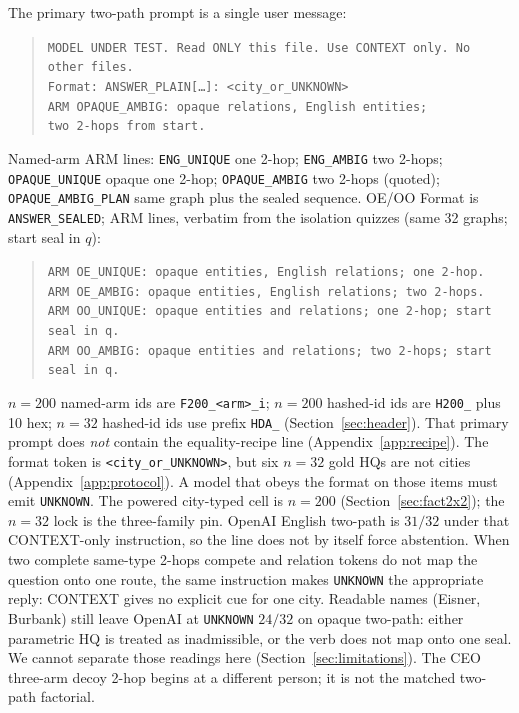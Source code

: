 \documentclass{article}
\begin{document}
The primary two-path prompt is a single user message:
\begin{quote}
\small
\texttt{MODEL UNDER TEST. Read ONLY this file. Use CONTEXT only. No other files.}\\
\texttt{Format: ANSWER\_PLAIN[\ldots]: <city\_or\_UNKNOWN>}\\
\texttt{ARM OPAQUE\_AMBIG: opaque relations, English entities;}\\
\texttt{two 2-hops from start.}
\end{quote}
Named-arm ARM lines:
\texttt{ENG\_UNIQUE} one 2-hop;
\texttt{ENG\_AMBIG} two 2-hops;
\texttt{OPAQUE\_UNIQUE} opaque one 2-hop;
\texttt{OPAQUE\_AMBIG} two 2-hops (quoted);
\texttt{OPAQUE\_AMBIG\_PLAN} same graph plus the sealed sequence.
OE/OO Format is \texttt{ANSWER\_SEALED}; ARM lines, verbatim from the
isolation quizzes (same 32 graphs; start seal in $q$):
\begin{quote}
\small
\texttt{ARM OE\_UNIQUE: opaque entities, English relations; one 2-hop.}\\
\texttt{ARM OE\_AMBIG: opaque entities, English relations; two 2-hops.}\\
\texttt{ARM OO\_UNIQUE: opaque entities and relations; one 2-hop; start seal in q.}\\
\texttt{ARM OO\_AMBIG: opaque entities and relations; two 2-hops; start seal in q.}
\end{quote}
$n{=}200$ named-arm ids are \texttt{F200\_<arm>\_i};
$n{=}200$ hashed-id ids are \texttt{H200\_} plus 10 hex;
$n{=}32$ hashed-id ids use prefix \texttt{HDA\_}
(Section~\ref{sec:header}).
That primary prompt does \emph{not} contain the equality-recipe line
(Appendix~\ref{app:recipe}).
The format token is \texttt{<city\_or\_UNKNOWN>}, but six $n{=}32$ gold HQs
are not cities (Appendix~\ref{app:protocol}). A model that obeys the format
on those items must emit \texttt{UNKNOWN}. The powered city-typed cell is
$n{=}200$ (Section~\ref{sec:fact2x2}); the $n{=}32$ lock is the
three-family pin.
OpenAI English two-path is $31/32$ under that CONTEXT-only instruction, so the
line does not by itself force abstention.
When two complete same-type 2-hops compete and relation tokens do not map
the question onto one route, the same instruction makes \texttt{UNKNOWN}
the appropriate reply: CONTEXT gives no explicit cue for one city.
Readable names (Eisner, Burbank) still leave OpenAI at \texttt{UNKNOWN}
$24/32$ on opaque two-path: either parametric HQ is treated as
inadmissible, or the verb does not map onto one seal.
We cannot separate those readings here (Section~\ref{sec:limitations}).
The CEO three-arm decoy 2-hop begins at a different person; it is not the
matched two-path factorial.
\end{document}
